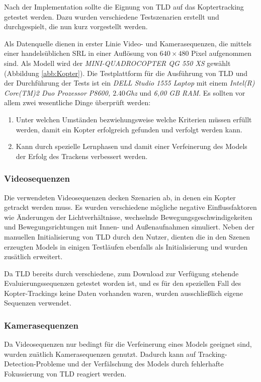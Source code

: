Nach der Implementation sollte die Eignung von TLD auf das Koptertracking getestet werden. Dazu wurden verschiedene Testszenarien erstellt und durchgespielt, die nun kurz vorgestellt werden.

Als Datenquelle dienen in erster Linie Video- und Kamerasequenzen, die mittels einer handelsüblichen SRL in einer Auflösung von $640\times480$ Pixel aufgenommen sind. Als Modell wird der \textit{MINI-QUADROCOPTER QG 550 XS} gewählt (Abbildung \ref{abb:Kopter}). Die Testplattform für die Ausführung von TLD und der Durchführung der Tests ist ein \textit{DELL Studio 1555 Laptop} mit einem \textit{Intel(R) Core(TM)2 Duo Prozessor P8600, $2.40$Ghz} und \textit{6,00 GB RAM}. Es sollten vor allem zwei wesentliche Dinge überprüft werden:

\begin{enumerate}
\item Unter welchen Umständen bezwiehungsweise welche Kriterien müssen erfüllt werden, damit ein Kopter erfolgreich gefunden und verfolgt werden kann.
\item Kann durch spezielle Lernphasen und damit einer Verfeinerung des Models der Erfolg des Trackens verbessert werden.
\end{enumerate}

\subsubsection{Videosequenzen}
Die verwendeten Videosequenzen decken Szenarien ab, in denen ein Kopter getrackt werden muss. Es wurden verschiedene mögliche negative Einflussfaktoren wie Änderungen der Lichtverhältnisse, wechselnde Bewegungsgeschwindigekeiten und Bewegungsrichtungen mit Innen- und Außenaufnahmen simuliert. Neben der manuellen Initialisierung von TLD durch den Nutzer, dienten die in den Szenen erzeugten Models in einigen Testläufen ebenfalls als Initialisierung und wurden zusätlich erweitert.

Da TLD bereits durch verschiedene, zum Download zur Verfügung stehende Evaluierungssequenzen getestet worden ist, und es für den speziellen Fall des Kopter-Trackings keine Daten vorhanden waren, wurden ausschließlich eigene Sequenzen verwendet.

\subsubsection{Kamerasequenzen}
Da Videosequenzen nur bedingt für die Verfeinerung eines Models geeignet sind, wurden zuätlich Kamerasequenzen genutzt. Dadurch kann auf Tracking-Detection-Probleme und der Verfälschung des Models durch fehlerhafte Fokussierung von TLD reagiert werden.